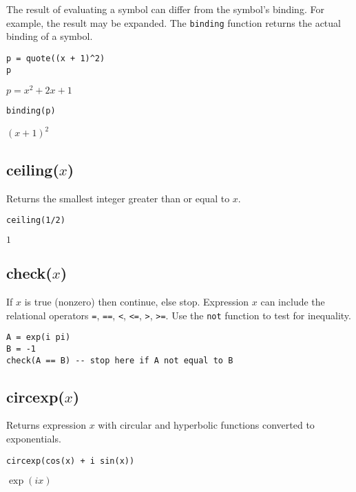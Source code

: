 The result of evaluating a symbol can differ from the symbol's binding.
For example, the result may be expanded.
The {\tt binding} function returns the actual binding of a symbol.

{\color{blue}
\begin{verbatim}
p = quote((x + 1)^2)
p
\end{verbatim}
}

\noindent
$p=x^2+2x+1$

{\color{blue}
\begin{verbatim}
binding(p)
\end{verbatim}
}

\noindent
$(x+1)^2$

\subsection*{ceiling($x$)}

Returns the smallest integer greater than or equal to $x$.

{\color{blue}
\begin{verbatim}
ceiling(1/2)
\end{verbatim}
}

\noindent
$1$

\subsection*{check($x$)}

If $x$ is true (nonzero) then continue, else stop.
Expression $x$ can include the relational operators
\verb$=$,
\verb$==$,
\verb$<$,
\verb$<=$,
\verb$>$,
\verb$>=$.
Use the
\verb$not$
function to test for inequality.

{\color{blue}
\begin{verbatim}
A = exp(i pi)
B = -1
check(A == B) -- stop here if A not equal to B
\end{verbatim}
}

\subsection*{circexp($x$)}

Returns expression $x$ with circular and hyperbolic functions
converted to exponentials.

{\color{blue}
\begin{verbatim}
circexp(cos(x) + i sin(x))
\end{verbatim}
}

\noindent
$\exp(ix)$

